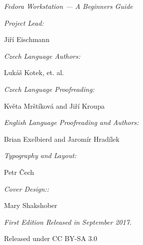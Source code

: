 \newpage\mbox{}\newpage
\begin{center}

{\it\large Fedora Workstation --- A Beginners Guide}

\bigskip

{\it Project Lead:}

Jiří Eischmann

{\it Czech Language Authors:}

Lukáš Kotek, et. al.

{\it Czech Language Proofreading:}

Květa Mrštíková and Jiří Kroupa

{\it English Language Proofreading and Authors:}

Brian Exelbierd and Jaromír Hradílek

{\it Typography and Layout:}

Petr Čech

{\it Cover Design::}

Mary Shakshober

{\it First Edition Released in September 2017.

Released under CC BY-SA 3.0}
\end{center}

